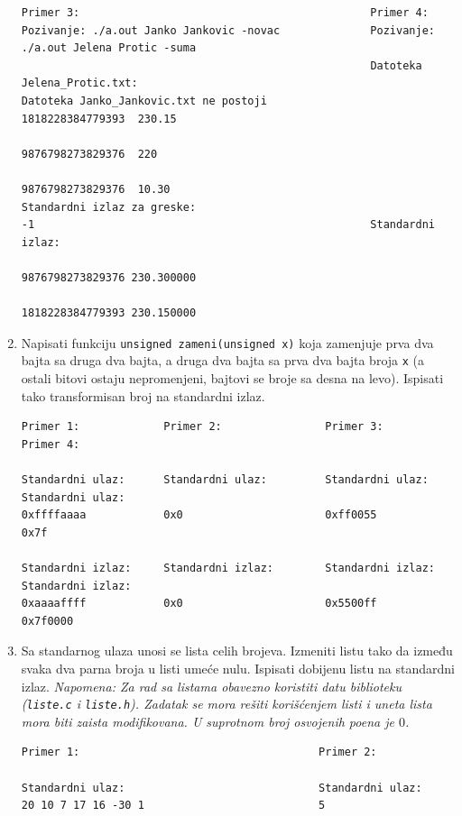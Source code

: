 \begin{enumerate}
\begin{verbatim}
Primer 3:                                             Primer 4:
Pozivanje: ./a.out Janko Jankovic -novac              Pozivanje: ./a.out Jelena Protic -suma
                                                      Datoteka Jelena_Protic.txt:
Datoteka Janko_Jankovic.txt ne postoji                1818228384779393  230.15
                                                      9876798273829376  220
                                                      9876798273829376  10.30
Standardni izlaz za greske:
-1                                                    Standardni izlaz:
                                                      9876798273829376 230.300000
                                                      1818228384779393 230.150000
\end{verbatim}

\item Napisati funkciju \texttt{unsigned zameni(unsigned x)} koja zamenjuje prva dva bajta sa druga dva bajta, a druga dva bajta sa prva dva bajta broja \texttt{x} (a ostali bitovi ostaju nepromenjeni, bajtovi se broje sa desna na levo). Ispisati tako transformisan broj na standardni izlaz.

\begin{verbatim}
Primer 1:             Primer 2:                Primer 3:               Primer 4:

Standardni ulaz:      Standardni ulaz:         Standardni ulaz:        Standardni ulaz:
0xffffaaaa            0x0                      0xff0055                0x7f

Standardni izlaz:     Standardni izlaz:        Standardni izlaz:       Standardni izlaz:
0xaaaaffff            0x0                      0x5500ff                0x7f0000
\end{verbatim}    
   

\item Sa standarnog ulaza unosi se lista celih brojeva. Izmeniti listu tako da između 
      svaka dva parna broja u listi umeće nulu. Ispisati dobijenu listu na standardni izlaz. 
      {\em Napomena: Za rad sa listama obavezno koristiti datu biblioteku 
      ({\tt liste.c} i {\tt liste.h}). Zadatak se mora rešiti korišćenjem listi i 
      uneta lista mora biti zaista modifikovana. U suprotnom broj osvojenih poena je $0$.}
\begin{verbatim}
Primer 1:                                     Primer 2:                

Standardni ulaz:                              Standardni ulaz:         
20 10 7 17 16 -30 1                           5                        


\end{verbatim}
\end{enumerate}

